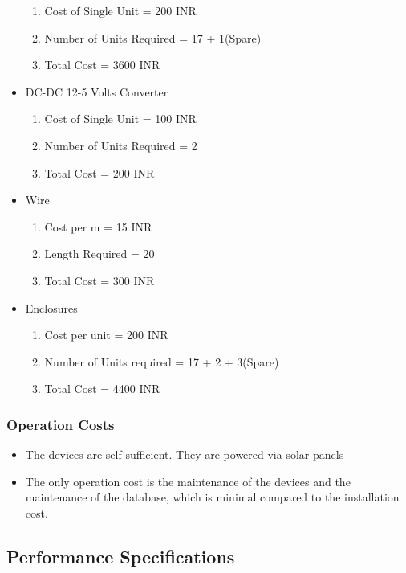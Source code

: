 \documentclass[12pt]{article} %
\begin{document}
\begin{itemize}
    \begin{enumerate}
        \item Cost of Single Unit = 200 INR
        \item Number of Units Required = 17 + 1(Spare)
        \item Total Cost = 3600 INR
    \end{enumerate}
    \item DC-DC 12-5 Volts Converter\cite{noauthor_dc_nodate}
    \begin{enumerate}
        \item Cost of Single Unit = 100 INR
        \item Number of Units Required = 2
        \item Total Cost = 200 INR
    \end{enumerate}
    \item Wire
    \begin{enumerate}
        \item Cost per m = 15 INR
        \item Length Required = 20
        \item Total Cost = 300 INR
    \end{enumerate}
    \item Enclosures
    \begin{enumerate}
        \item Cost per unit = 200 INR
        \item Number of Units required = 17 + 2 + 3(Spare)
        \item Total Cost = 4400 INR
    \end{enumerate}
\end{itemize} 
\subsubsection{Operation Costs}
\begin{itemize}
    \item The devices are self sufficient. They are powered via solar panels
    \item The only operation cost is the maintenance of the devices and the maintenance of the database, which is minimal compared to the installation cost.
\end{itemize}

\subsection{Performance Specifications}
\end{document}
